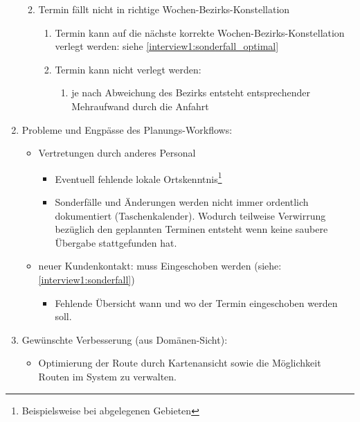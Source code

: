 \documentclass[Bachelorarbeit.tex]{subfiles}
\begin{document}
\begin{enumerate}
\begin{enumerate}
\begin{enumerate}
		\end{enumerate}
		\item Termin fällt nicht in richtige Wochen-Bezirks-Konstellation
		\begin{enumerate}
			\item Termin kann auf die nächste korrekte Wochen-Bezirks-Konstellation verlegt werden:
			siehe \ref{interview1:sonderfall_optimal}
			\item Termin kann nicht verlegt werden:
			\begin{enumerate}
				\item[] je nach Abweichung des Bezirks entsteht entsprechender Mehraufwand durch die Anfahrt
			\end{enumerate}
		\end{enumerate}
	\end{enumerate}
	\item Probleme und Engpässe des Planungs-Workflows:
	\begin{itemize}
		\item Vertretungen durch anderes Personal
		\begin{itemize}
			\item Eventuell fehlende lokale Ortskenntnis\footnote{Beispielsweise bei abgelegenen Gebieten}
			\item Sonderfälle und Änderungen werden nicht immer ordentlich dokumentiert (Taschenkalender). Wodurch teilweise Verwirrung bezüglich den geplannten Terminen entsteht wenn keine saubere Übergabe stattgefunden hat.  
		\end{itemize}
		\item neuer Kundenkontakt: muss Eingeschoben werden (siehe: \ref{interview1:sonderfall})
		\begin{itemize}
			\item Fehlende Übersicht wann und wo der Termin eingeschoben werden soll.
		\end{itemize}
	\end{itemize}
	\item Gewünschte Verbesserung (aus Domänen-Sicht):
	\begin{itemize}
		\item[] Optimierung der Route durch Kartenansicht sowie die Möglichkeit Routen im System zu verwalten.
	
	\end{itemize}
\end{enumerate}
\newpage
\end{document}
